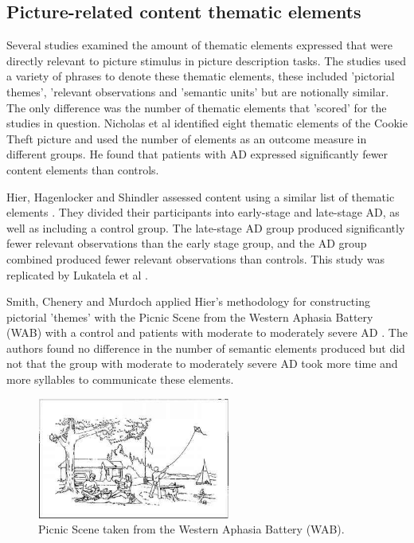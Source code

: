 \documentclass[10pt, letterpaper, twoside, openany]{book}
\begin{document}
\subsection{Picture-related content thematic elements}
Several studies examined the amount of thematic elements expressed that were directly relevant to picture stimulus in picture description tasks. The studies used a variety of phrases to denote these thematic elements, these included 'pictorial themes', 'relevant observations and 'semantic units' but are notionally similar. The only difference was the number of thematic elements that 'scored' for the studies in question. Nicholas et al identified eight thematic elements of the Cookie Theft picture and used the number of elements as an outcome measure in different groups. He found that patients with AD expressed significantly fewer content elements than controls.
\par
Hier, Hagenlocker and Shindler assessed content using a similar list of thematic elements \cite{Hier1985}. They divided their participants into early-stage and late-stage AD, as well as including a control group. The late-stage AD group produced significantly fewer relevant observations than the early stage group, and the AD group combined produced fewer relevant observations than controls. This study was replicated by Lukatela et al \cite{Lukatela1998}.
\par
Smith, Chenery and Murdoch applied Hier's methodology for constructing pictorial 'themes' with the Picnic Scene from the Western Aphasia Battery (WAB) with a control and patients with moderate to moderately severe AD \cite{Smith1989}. The authors found no difference in the number of semantic elements produced but did not that the group with moderate to moderately severe AD took more time and more syllables to communicate these elements.
\par
\begin{figure}[H]
\centering
\includegraphics[width=240px, height=150px]{images/picnic-scene.jpg}
\caption{Picnic Scene taken from the Western Aphasia Battery (WAB).\label{white}}
\end{figure}
\end{document}
